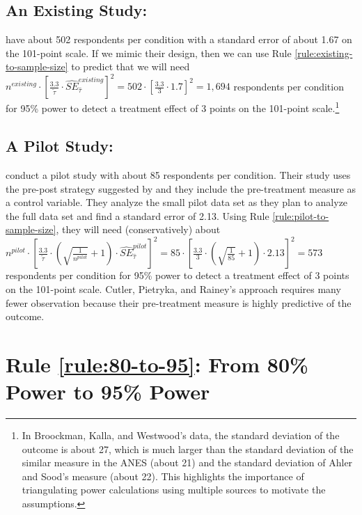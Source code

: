 \documentclass[12pt]{article}
\begin{document}
\subsection*{An Existing Study: \cite{Broockman2022}}

\cite{Broockman2022} have about 502 respondents per condition with a standard error of about 1.67 on the 101-point scale.
If we mimic their design, then we can use Rule \ref{rule:existing-to-sample-size} to predict that we will need $n^{existing} \cdot \left\lbrack \frac{3.3}{\widetilde{\tau}} \cdot {\widehat{SE}}_{\widehat{\tau}}^{existing} \right\rbrack^{2} = 502 \cdot \left\lbrack \frac{3.3}{3} \cdot 1.7 \right\rbrack^{2} =1,694$ respondents per condition for 95\% power to detect a treatment effect of 3 points on the 101-point scale.\footnote{
  In Broockman, Kalla, and Westwood's data, the standard deviation of the outcome is about 27, which is much larger than the standard deviation of the similar measure in the ANES (about 21) and the standard deviation of Ahler and Sood's measure (about 22). 
  This highlights the importance of triangulating power calculations using multiple sources to motivate the assumptions.
  }

\subsection*{A Pilot Study: \cite{Culter2024}}

\cite{Culter2024} conduct a pilot study with about 85 respondents per condition. 
Their study uses the pre-post strategy suggested by \cite{Clifford2021} and they include the pre-treatment measure as a control variable. 
They analyze the small pilot data set as they plan to analyze the full data set and find a standard error of 2.13. 
Using Rule \ref{rule:pilot-to-sample-size}, they will need (conservatively) about
$n^{pilot} \cdot \left\lbrack \frac{3.3}{\widetilde{\tau}} \cdot \left( \sqrt{\frac{1}{n^{pilot}}} + 1 \right) \cdot {\widehat{SE}}_{\widehat{\tau}}^{pilot} \right\rbrack^{2} = 85 \cdot \left\lbrack \frac{3.3}{3} \cdot \left( \sqrt{\frac{1}{85}} + 1 \right) \cdot 2.13 \right\rbrack^{2} = 573$ respondents per condition for 95\% power to detect a treatment effect of 3 points on the 101-point scale. Cutler, Pietryka, and Rainey's approach requires many fewer observation because their pre-treatment measure is highly predictive of the outcome.

\section*{Rule \ref{rule:80-to-95}: From 80\% Power to 95\% Power}
\end{document}
